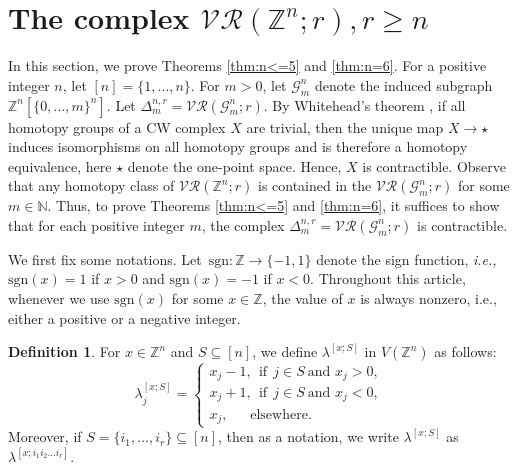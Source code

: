 \documentclass{amsart}
\theoremstyle{definition}
\newtheorem{definition}[theorem]{Definition}
\newtheorem{proposition}[theorem]{Proposition}
\theoremstyle{remark}
\numberwithin{equation}{section}
\newcommand{\lk}{\mbox{\upshape lk}\,}
\newcommand{\G}{\mathcal{G}}
\newcommand{\vr}[2]{\mathcal{VR}(#1;#2)}
\def\Z{{\mathbb{Z}}}
\begin{document}















\section{The complex $\vr{\Z^n}{r}, r \geq n$}\label{sec:vr1}

In this section, we prove Theorems \ref{thm:n<=5} and \ref{thm:n=6}. For a positive integer  $n$, let $[n]= \{1, \ldots, n\}$.  For $m > 0$,  let $\G_m^n$ denote the induced  subgraph $\Z^n[\{0, \ldots, m\}^n]$. Let $\Delta_m^{n, r} = \vr{\G_m^n}{r}$. By Whitehead's theorem \cite{Whitehead}, if all homotopy groups of a CW complex $X$ are trivial, then the unique map $X \to \star$ induces isomorphisms on all homotopy groups and is therefore a homotopy equivalence, here $\star$ denote the one-point space. Hence, $X$ is contractible. Observe that  any homotopy class of $\vr{\mathbb{Z}^n}{r}$ is contained in the $\vr{\G_m^n}{r}$ for some $m\in \mathbb{N}$.
Thus, to prove Theorems \ref{thm:n<=5} and \ref{thm:n=6}, it suffices to show that for each positive integer $m$, the complex $\Delta_m^{n, r} = \vr{\G_m^n}{r}$ is contractible. 






We first fix some notations. Let  $\,\mathrm{sgn}:\mathbb{Z}\to\{-1,1\}$ denote the sign function, {\it i.e.,}  $\mathrm{sgn}(x)=1$ if $x>0$ and $\mathrm{sgn}(x)=-1$ if $x<0$. Throughout this article, whenever we use $\mathrm{sgn}(x)$ for some $x\in\mathbb{Z}$, the value of $x$ is always nonzero, i.e., either a positive or a negative integer.



\begin{definition}
	{\rm For $x\in\mathbb{Z}^n$ and $S\subseteq [n]$, we define $\lambda^{[x;S]}$ in $V(\Z^n)$ as follows: 
		$$
		\lambda^{[x;S]}_j = \begin{cases}
			x_j -1, \ \ \text{if} \ \  j\in S\ \text{and }  x_j > 0,\\
			x_j +1, \ \ \text{if} \  \ j\in S \ \text{and }   x_j <  0,\\
			x_j, \ \ \ \ \ \ \   \text{elsewhere} .
		\end{cases}
		$$ Moreover, if $S=\{i_1,\dots,i_r\}\subseteq[n]$, then as a notation, we write $\lambda^{[x;S]}$ as $\lambda^{[x;i_1i_2\dots i_r]}$.}
	
	
\end{definition}
\end{document}

